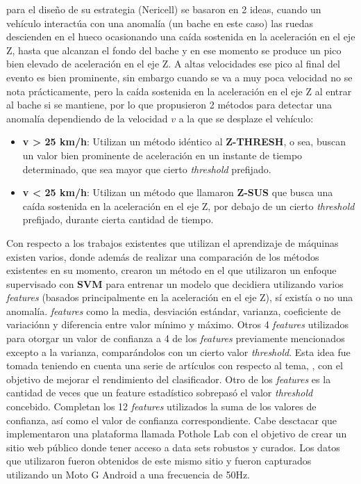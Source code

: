 \cite{mohan2008nericell} para el diseño de su estrategia (Nericell) se basaron en 2 ideas, cuando un vehículo interactúa con una
anomalía (un bache en este caso) las ruedas descienden en el hueco ocasionando una caída sostenida en la aceleración en el eje Z,
hasta que alcanzan el fondo del bache y en ese momento se produce un pico bien elevado de aceleración en el eje Z. A altas velocidades
ese pico al final del evento es bien prominente, sin embargo cuando se va a muy poca velocidad no se nota prácticamente, pero la caída
sostenida en la aceleración en el eje Z al entrar al bache si se mantiene, por lo que propusieron 2 métodos para detectar una anomalía
dependiendo de la velocidad $v$ a la que se desplaze el vehículo:\\

\begin{itemize}
	\item  \textbf {v > 25 km/h}:  Utilizan un método idéntico al \textbf {Z-THRESH}, o sea, buscan un valor bien prominente de
	      aceleración en un instante de tiempo determinado, que sea mayor que cierto \emph{threshold} prefijado.\\
	\item \textbf {v < 25 km/h}:  Utilizan un método que llamaron \textbf {Z-SUS} que busca una caída sostenida en la aceleración
	      en el eje Z, por debajo de un cierto \emph{threshold} prefijado, durante cierta cantidad de tiempo.\\
\end{itemize}

Con respecto a los trabajos existentes que utilizan el aprendizaje de máquinas existen varios, \cite{carlos2018evaluation} donde además de realizar
una comparación de los métodos existentes en su momento, crearon un método en el que utilizaron un enfoque supervisado con \textbf{SVM} para entrenar
un modelo que decidiera utilizando varios \emph{features} (basados principalmente en la aceleración en el eje Z), sí existía o no una anomalía. \emph{features}
como la media, desviación estándar, varianza, coeficiente de variaciónn y diferencia entre valor mínimo y máximo. Otros 4 \emph{features} utilizados para
otorgar un valor de confianza a 4 de los \emph{features} previamente mencionados excepto a la varianza, comparándolos con un cierto valor \emph{threshold}. Esta idea
fue tomada teniendo en cuenta una serie de artículos con respecto al tema, \cite{mednis2011real}, con el objetivo de mejorar el rendimiento
del clasificador. Otro de los \emph{features} es la cantidad de veces que un feature estadístico sobrepasó el valor \emph{threshold} concebido. Completan los 12 \emph{features}
utilizados la suma de los valores de confianza, así como el valor de confianza correspondiente. Cabe desctacar que implementaron una plataforma llamada
Pothole Lab con el objetivo de crear un sitio web público donde tener acceso a data sets robustos y curados. Los datos que utilizaron fueron obtenidos de este
mismo sitio y fueron capturados utilizando un Moto G Android a una frecuencia de 50Hz.\\

